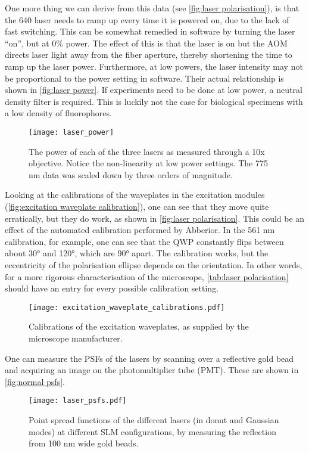 One more thing we can derive from this data (see \autoref{fig:laser polarisation}), is that the 640 laser needs to ramp up every time it is powered on, due to the lack of fast switching.
This can be somewhat remedied in software by turning the laser ``on'', but at 0\% power. The effect of this is that the laser is on but the AOM directs laser light away from the fiber aperture, thereby shortening the time to ramp up the laser power. Furthermore, at low powers, the laser intensity may not be proportional to the power setting in software. Their actual relationship is shown in \autoref{fig:laser power}. If experiments need to be done at low power, a neutral density filter is required. This is luckily not the case for biological specimens with a low density of fluorophores.

\begin{figure}[ht]
	\centering
	\texttt{[image: laser\_power]}
	\caption{
		The power of each of the three lasers as measured through a 10x objective. Notice the non-linearity at low power settings. The 775 nm data was scaled down by three orders of magnitude.
	}
	\label{fig:laser power}
\end{figure}

Looking at the calibrations of the waveplates in the excitation modules (\autoref{fig:excitation waveplate calibration}), one can see that they move quite erratically, but they do work, as shown in \autoref{fig:laser polarisation}. This could be an effect of the automated calibration performed by Abberior. In the 561 nm calibration, for example, one can see that the QWP constantly flips between about \ang{30} and \ang{120}, which are \ang{90} apart. The calibration works, but the eccentricity of the polarisation ellipse depends on the orientation. In other words, for a more rigorous characterisation of the microscope, \autoref{tab:laser polarisation} should have an entry for every possible calibration setting.

\begin{figure}
	\centering
	\texttt{[image: excitation\_waveplate\_calibrations.pdf]}
	\caption{
		Calibrations of the excitation waveplates, as supplied by the microscope manufacturer.
	}
	\label{fig:excitation waveplate calibration}
\end{figure}

One can measure the PSFs of the lasers by scanning over a reflective gold bead and acquiring an image on the photomultiplier tube (PMT). These are shown in \autoref{fig:normal psfs}.

\begin{figure}
	\centering
	\texttt{[image: laser\_psfs.pdf]}
	\caption{
		Point spread functions of the different lasers (in donut and Gaussian modes) at different SLM configurations, by measuring the reflection from 100 nm wide gold beads.
	}
	\label{fig:normal psfs}
\end{figure}

